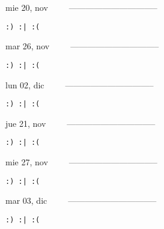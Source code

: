 \documentclass[letterpaper,10pt]{article}
\begin{document}
\begin{multicols}{3}
{mie 20, nov\ \ \ \ \ --------------------------------}
\begin{flushright}\begin{small}\texttt{:) :| :(}\end{small}\end{flushright}
\vfill
{mar 26, nov\ \ \ \ \ --------------------------------}
\begin{flushright}\begin{small}\texttt{:) :| :(}\end{small}\end{flushright}\par
\vfill
{lun 02, dic\ \ \ \ \ --------------------------------}
\begin{flushright}\begin{small}\texttt{:) :| :(}\end{small}\end{flushright}\par
\vfill
\end{multicols}
\vspace{1.05cm}

\begin{multicols}{3}
{jue 21, nov\ \ \ \ \ --------------------------------}
\begin{flushright}\begin{small}\texttt{:) :| :(}\end{small}\end{flushright}
\vfill
{mie 27, nov\ \ \ \ \ --------------------------------}
\begin{flushright}\begin{small}\texttt{:) :| :(}\end{small}\end{flushright}\par
\vfill
{mar 03, dic\ \ \ \ \ --------------------------------}
\begin{flushright}\begin{small}\texttt{:) :| :(}\end{small}\end{flushright}\par
\vfill
\end{multicols}
\vspace{1.05cm}
\end{document}
